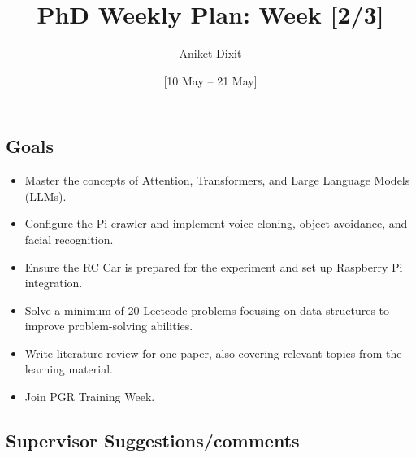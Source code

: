 \documentclass{article}
\title{PhD Weekly Plan: Week [2/3]}
\author{Aniket Dixit}
\date{[10 May -- 21 May]}
\begin{document}
\maketitle

\subsection*{Goals}
\begin{itemize}
    \item Master the concepts of Attention, Transformers, and Large Language Models (LLMs).
    \item Configure the Pi crawler and implement voice cloning, object avoidance, and facial recognition.
    \item Ensure the RC Car is prepared for the experiment and set up Raspberry Pi integration.
    \item Solve a minimum of 20 Leetcode problems focusing on data structures to improve problem-solving abilities.
    \item Write literature review for one paper, also covering relevant topics from the learning material.
     \item Join PGR Training Week.
    
\end{itemize}


\subsection*{Supervisor Suggestions/comments}
\end{document}
